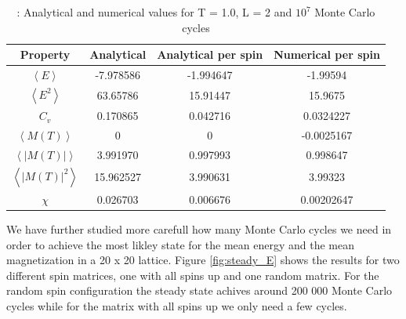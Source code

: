 \documentclass{article}
\begin{document}
{\renewcommand{\arraystretch}{1.5}
\begin{table}[h!]
  \caption{: Analytical and numerical values for T = 1.0, L = 2 and $10^7$ Monte Carlo cycles }
    \label{Tab: values}
    \centering
  \begin{tabular}{c c c c}
    Property & Analytical & Analytical per spin & Numerical per spin \\
    \hline
    $\left<E\right>$ & -7.978586  & -1.994647 & -1.99594\\
    $\left<E^2\right>$ & 63.65786 & 15.91447 &15.9675 \\
    $C_v$ & 0.170865 & 0.042716 & 0.0324227 \\
    $\left<M(T)\right>$  & 0 & 0 & -0.0025167\\
    $\left<|M(T)|\right>$ & 3.991970 & 0.997993 & 0.998647 \\
    $\left<|M(T)|^2\right> $ & 15.962527 & 3.990631 & 3.99323\\
    $\chi$ & 0.026703 & 0.006676 & 0.00202647\\
  \end{tabular}
\end{table}

We have further studied more carefull how many Monte Carlo cycles we need in order to achieve the most likley state for the mean energy and the mean magnetization in a 20 x 20 lattice. Figure \ref{fig:steady_E} shows the results for two different spin matrices, one with all spins up and one random matrix. For the random spin configuration the steady state achives around 200 000 Monte Carlo cycles while for the matrix with all spins up we only need a few cycles.

}
\end{document}
